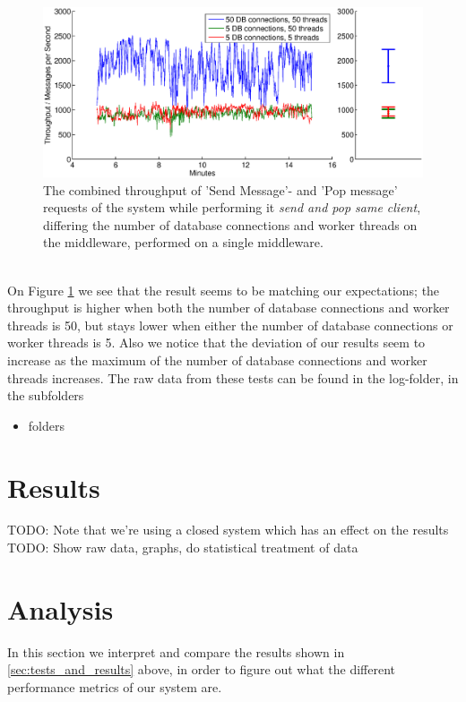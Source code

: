 \documentclass{article}
\begin{document}
             \begin{figure}[H]
                 \centering
                 \includegraphics[scale=0.50]{throughput_vs_dbconns}
                 \caption{The combined throughput of 'Send Message'- and 'Pop message' requests of the system while performing it \textit{send and pop same client}, differing the number of database connections and worker threads on the middleware, performed on a single middleware.}
                 \label{fig:throughput_vs_dbconns}
             \end{figure}
             ~\\
             On Figure \ref{fig:throughput_vs_dbconns} we see that the result seems to be matching our expectations; the throughput is higher when both the number of database connections and worker threads is 50, but stays lower when either the number of database connections or worker threads is 5. Also we notice that the deviation of our results seem to increase as the maximum of the number of database connections and worker threads increases.
            The raw data from these tests can be found in the log-folder, in the subfolders
            \begin{itemize}
                \item folders
            \end{itemize}

    \section{Results}
        TODO: Note that we're using a closed system which has an effect on the results\\
        TODO: Show raw data, graphs, do statistical treatment of data
            
    \section{Analysis}
        In this section we interpret and compare the results shown in \ref{sec:tests_and_results} above, in order to figure out what the different performance metrics of our system are.
\end{document}
